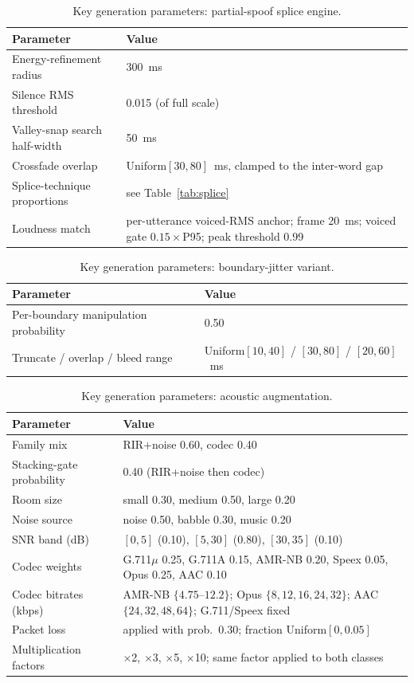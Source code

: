 \documentclass[11pt]{report}
\begin{document}
\begin{table}[H]
\centering
\caption{Key generation parameters: partial-spoof splice engine.}
\label{tab:params-splice}
\small
\begin{tabular}{p{4.9cm}p{7.2cm}}
\toprule
\textbf{Parameter} & \textbf{Value} \\
\midrule
Energy-refinement radius & \SI{300}{\milli\second} \\
Silence RMS threshold & 0.015 (of full scale) \\
Valley-snap search half-width & \SI{50}{\milli\second} \\
Crossfade overlap & Uniform$[30,80]$~ms, clamped to the inter-word gap \\
Splice-technique proportions & see Table~\ref{tab:splice} \\
Loudness match & per-utterance voiced-RMS anchor; frame \SI{20}{\milli\second}; voiced gate $0.15\times$P95; peak threshold 0.99 \\
\bottomrule
\end{tabular}
\end{table}

\begin{table}[H]
\centering
\caption{Key generation parameters: boundary-jitter variant.}
\label{tab:params-jitter}
\small
\begin{tabular}{p{4.9cm}p{7.2cm}}
\toprule
\textbf{Parameter} & \textbf{Value} \\
\midrule
Per-boundary manipulation probability & 0.50 \\
Truncate / overlap / bleed range & Uniform$[10,40]$ / $[30,80]$ / $[20,60]$~ms \\
\bottomrule
\end{tabular}
\end{table}

\begin{table}[H]
\centering
\caption{Key generation parameters: acoustic augmentation.}
\label{tab:params-augmentation}
\small
\begin{tabular}{p{4.9cm}p{7.2cm}}
\toprule
\textbf{Parameter} & \textbf{Value} \\
\midrule
Family mix & RIR+noise 0.60, codec 0.40 \\
Stacking-gate probability & 0.40 (RIR+noise then codec) \\
Room size & small 0.30, medium 0.50, large 0.20 \\
Noise source & noise 0.50, babble 0.30, music 0.20 \\
SNR band (dB) & $[0,5]$ (0.10), $[5,30]$ (0.80), $[30,35]$ (0.10) \\
Codec weights & G.711$\mu$ 0.25, G.711A 0.15, AMR-NB 0.20, Speex 0.05, Opus 0.25, AAC 0.10 \\
Codec bitrates (kbps) & AMR-NB $\{4.75\text{--}12.2\}$; Opus $\{8,12,16,24,32\}$; AAC $\{24,32,48,64\}$; G.711/Speex fixed \\
Packet loss & applied with prob.\ 0.30; fraction Uniform$[0,0.05]$ \\
Multiplication factors & $\times$2, $\times$3, $\times$5, $\times$10; same factor applied to both classes \\
\bottomrule
\end{tabular}
\end{table}
\end{document}
